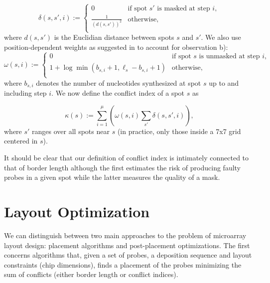 \documentclass{article}
\begin{document}
\begin{equation}
\label{eq:dist_weight} \delta(s,s',i) :=
        \left\{
                \begin{array}{ll}
                        0 & \mbox{if spot $s'$ is masked at step $i$}, \\
                        \frac{1}{(d(s,s'))^{2}} & \mbox{otherwise}, \\
                \end{array}
        \right.
\end{equation}
where $d(s,s')$ is the Euclidian distance between spots $s$ and $s'$. We also use position-dependent weights as suggested in \cite{KAHNG03} to account for observation b):
\begin{equation}
\label{eq:pos_mult} \omega(s,i) :=
        \left\{
                \begin{array}{ll}
                        0 & \mbox{if spot $s$ is unmasked at step $i$}, \\
                        1 + \log{\min(b_{s,i} + 1,\ell_{s} - b_{s,i} + 1)} & \mbox{otherwise}, \\
                \end{array}
        \right.
\end{equation}
where $b_{s,i}$ denotes the number of nucleotides synthesized at spot $s$ up to and including step $i$. We now define the conflict index of a spot $s$ as

\begin{equation}
\label{eq:conf_idx} \kappa(s) := \sum_{i=1}^{\mu} \left( \omega(s,i) \sum_{s'} \delta(s,s',i) \right),
\end{equation}
where $s'$ ranges over all spots near $s$ (in practice, only those inside a 7x7 grid centered in $s$).

It should be clear that our definition of conflict index is intimately connected to that of border length although the first estimates the risk of producing faulty probes in a given spot while the latter measures the quality of a mask.

\section{Layout Optimization}

We can distinguish between two main approaches to the problem of microarray layout design: placement algorithms and post-placement optimizations. The first concerns algorithms that, given a set of probes, a deposition sequence and layout constraints (chip dimensions), finds a placement of the probes minimizing the sum of conflicts (either border length or conflict indices).
\end{document}

